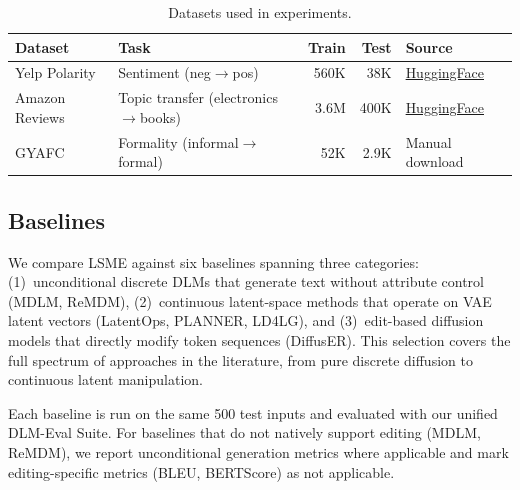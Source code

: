 \documentclass{article}
\begin{document}
\begin{table}[h]
\centering
\caption{Datasets used in experiments.}
\label{tab:datasets}
\begin{tabular}{llrrl}
\toprule
\textbf{Dataset} & \textbf{Task} & \textbf{Train} & \textbf{Test} & \textbf{Source} \\
\midrule
Yelp Polarity & Sentiment (neg$\to$pos) & 560K & 38K & \href{https://huggingface.co/datasets/yelp_polarity}{HuggingFace} \\
Amazon Reviews & Topic transfer (electronics$\to$books) & 3.6M & 400K & \href{https://huggingface.co/datasets/amazon_polarity}{HuggingFace} \\
GYAFC & Formality (informal$\to$formal) & 52K & 2.9K & Manual download \\
\bottomrule
\end{tabular}
\end{table}

\subsection{Baselines}

We compare LSME against six baselines spanning three categories: (1)~unconditional discrete DLMs that generate text without attribute control (MDLM, ReMDM), (2)~continuous latent-space methods that operate on VAE latent vectors (LatentOps, PLANNER, LD4LG), and (3)~edit-based diffusion models that directly modify token sequences (DiffusER). This selection covers the full spectrum of approaches in the literature, from pure discrete diffusion to continuous latent manipulation.

Each baseline is run on the same 500 test inputs and evaluated with our unified DLM-Eval Suite. For baselines that do not natively support editing (MDLM, ReMDM), we report unconditional generation metrics where applicable and mark editing-specific metrics (BLEU, BERTScore) as not applicable.
\end{document}
